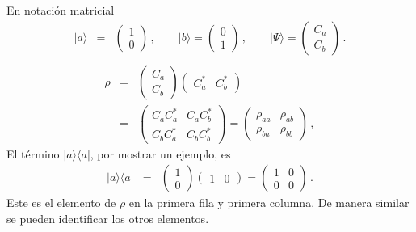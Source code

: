 \documentclass[twocolumn,aps,eqsecnum]{revtex4}
\providecommand{\bra}[1]{\langle #1 \rvert}
\providecommand{\ket}[1]{\lvert #1 \rangle}
\begin{document}
En notaci\'on matricial 
%
\begin{eqnarray}
\ket{a} &=&  \left( \begin{array}{c} 1 \\ 0 \end{array} \right) \,, \qquad 
	\ket{b} = \left( \begin{array}{c} 0 \\ 1 \end{array} \right) \,, \qquad 
	\ket{\Psi} = \left( \begin{array}{c} C_a \\ C_b \end{array} \right) \,. 
	\nonumber \\
\end{eqnarray}
%
\begin{eqnarray}
\rho &=&  \left( \begin{array}{c} C_a \\ C_b \end{array} \right) 
	\left( \begin{array}{cc} C_a^{\ast} & C_b^{\ast} \end{array} \right) 	
	\nonumber \\ 
&=& \left( \begin{array}{cc}  C_a C_a^{\ast} & C_a C_b^{\ast}  \\ 
	C_b C_a^{\ast}  & C_b C_b^{\ast}   \end{array} \right) 	
	=  \left( \begin{array}{cc}  \rho_{aa} & \rho_{ab}  \\ 
	\rho_{ba}  & \rho_{bb}   \end{array} \right) 	\,,
\end{eqnarray}
El t\'ermino $\ket{a}\bra{a}$, por mostrar un ejemplo, es 
%
\begin{eqnarray}
\ket{a}\bra{a} &=&  \left( \begin{array}{c} 1 \\ 0 \end{array} \right) 
	\left( \begin{array}{cc} 1 & 0 \end{array} \right) 	
	= \left( \begin{array}{cc}  1 & 0  \\ 0  & 0   \end{array} \right) \,.
\end{eqnarray}
Este es el elemento de $\rho$ en la primera fila y primera columna. 
De manera similar se pueden identificar los otros elementos. 
\end{document}
